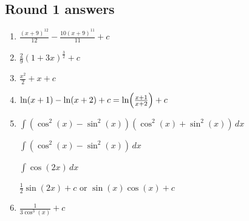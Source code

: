 \documentclass[12pt, letterpaper]{article}
\begin{document}
\subsection*{Round 1 answers}
\begin{enumerate}[itemsep=1cm]
    \item 
    $\frac{(x+9)^{12}}{12}-\frac{10(x+9)^{11}}{11}+c$

    \item 
    $\frac{2}{9}(1+3x)^{\frac{3}{2}}+c$

    \item 
    $\frac{x^2}{2}+x+c$

    \item 
    $\ln(x+1)-\ln(x+2)+c = \ln\Bigl(\frac{x+1}{x+2}\Bigr)+c$

    \item
    $\int (\cos^2(x)-\sin^2(x))(\cos^2(x)+\sin^2(x))\,dx$

    $\int (\cos^2(x)-\sin^2(x))\,dx$
    
    $\int \cos(2x)\,dx$

    $\frac{1}{2}\sin(2x)+c$ or $\sin(x)\cos(x)+c$

    \item 
    $\frac{1}{3\cos^3(x)}+c$
\end{enumerate}
\pagebreak
\end{document}
